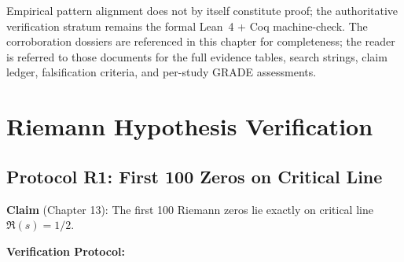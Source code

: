 Empirical pattern alignment does not by itself constitute proof; the
authoritative verification stratum remains the formal Lean~4 + Coq
machine-check. The corroboration dossiers are referenced in this
chapter for completeness; the reader is referred to those documents
for the full evidence tables, search strings, claim ledger,
falsification criteria, and per-study GRADE assessments.

\section{Riemann Hypothesis Verification}
\label{sec:riemann-verification}

\subsection{Protocol R1: First 100 Zeros on Critical Line}

\textbf{Claim} (Chapter 13): The first 100 Riemann zeros lie exactly on critical line $\Re(s) = 1/2$.

\textbf{Verification Protocol:}


